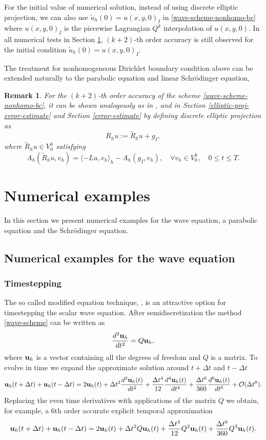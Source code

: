 \documentclass[onefignum,onetabnum]{siamart171218}
\newtheorem{remark}[theorem]{Remark}
\begin{document}
For the initial value of numerical solution, instead of using discrete elliptic projection, we can also use $\tilde u_h(0)=u(x,y,0)_I$ in \eqref{wave-scheme-nonhomo-bc} where  $u(x,y,0)_I$ is the piecewise Lagrangian $Q^k$ interpolation of $u(x,y,0)$. In all numerical tests in Section \ref{numerical-test}, $(k+2)$-th order accuracy is still observed for the initial condition $\tilde u_h(0)=u(x,y,0)_I$.

 The treatment for nonhomogeneous Dirichlet boundary condition above can be extended naturally to  the parabolic equation and linear Schr\"{o}dinger equation,

\begin{remark}
For the $(k+2)$-th order accuracy of the scheme \eqref{wave-scheme-nonhomo-bc}, it can be shown analogously as in \cite{li2020superconvergence}, and in Section \ref{elliptic-proj-error-estimate} and Section \ref{error-estimate} by defining discrete elliptic projection as
\begin{equation}\label{elliptic-proj-nonhomo}
R_h u := \tilde R_h u + g_I,
\end{equation}
where $\tilde R_hu \in V_0^h$ satisfying
\begin{equation*}
A_h(\tilde R_h u,v_h) = \langle -Lu,v_h \rangle_h- A_h(g_I,v_h),\quad \forall v_h\in V^h_0, \quad 0\leq t \leq T.
\end{equation*} 
\end{remark}


\section{Numerical examples}\label{numerical-test}
In this section we present numerical examples for the wave equation, a parabolic equation and the Schr\"{o}dinger equation. 
\subsection{Numerical examples for the wave equation}
\subsubsection{Timestepping} \label{sec:timestepping}
The so called modified equation technique, \cite{Dablain1986,37342,henshaw:1730,joly2010optimized}, is an attractive option for timestepping the scalar wave equation. 
After semidiscretization the method \eqref{wave-scheme} can be written as 
\[
\frac{d^2 {\bf u}_h}{dt^2} = Q {\bf u}_h,
\]
where ${\bf u}_h$ is a vector containing all the degrees of freedom and $Q$ is a matrix.  To evolve in time we expand the approximate solution around $t+\Delta t$ and $t-\Delta t$   
\[
{\bf u}_h(t+\Delta t) + {\bf u}_h(t-\Delta t) = 2 {\bf u}_h(t) + \Delta t^2 \frac{d^2 {\bf u}_h(t)}{dt^2} 
+ \frac{\Delta t^4}{12} \frac{d^4 {\bf u}_h(t)}{dt^4} 
+ \frac{\Delta t^6}{360} \frac{d^6 {\bf u}_h(t)}{dt^6} + \mathcal{O}(\Delta t^8).  
\]
Replacing the even time derivatives with applications of the matrix $Q$ we obtain, for example, a 6th order accurate explicit temporal approximation   
\[
{\bf u}_h(t+\Delta t) + {\bf u}_h(t-\Delta t) = 2 {\bf u}_h(t) + \Delta t^2 Q {\bf u}_h(t) 
+ \frac{\Delta t^4}{12} Q^2 {\bf u}_h(t) + \frac{\Delta t^6}{360} Q^3 {\bf u}_h(t).  
\]
\end{document}

